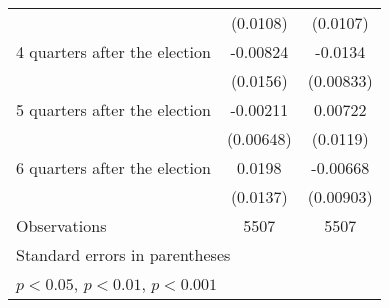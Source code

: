 \begin{table}[htbp]
\begin{tabular}{l*{2}{c}}
                    &    (0.0108)         &    (0.0107)         \\
[1em]
 4 quarters after the election&    -0.00824         &     -0.0134         \\
                    &    (0.0156)         &   (0.00833)         \\
[1em]
 5 quarters after the election&    -0.00211         &     0.00722         \\
                    &   (0.00648)         &    (0.0119)         \\
[1em]
 6 quarters after the election&      0.0198         &    -0.00668         \\
                    &    (0.0137)         &   (0.00903)         \\
\hline
Observations        &        5507         &        5507         \\
\hline\hline
\multicolumn{3}{l}{\footnotesize Standard errors in parentheses}\\
\multicolumn{3}{l}{\footnotesize \sym{*} \(p<0.05\), \sym{**} \(p<0.01\), \sym{***} \(p<0.001\)}\\
\end{tabular}
\end{table}
